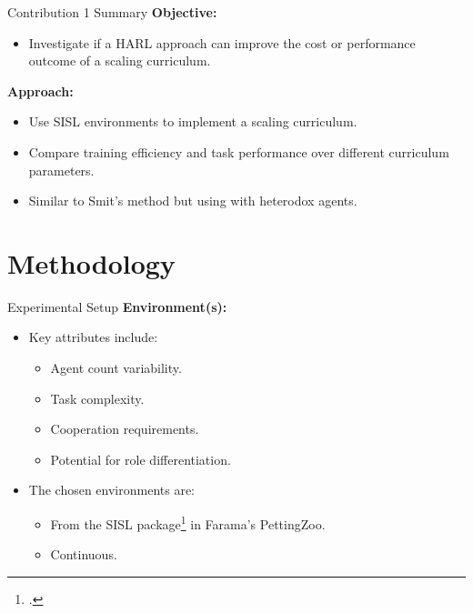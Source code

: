 \documentclass[xcolor={svgnames}]{beamer}
\begin{document}

\begin{frame}{Contribution 1 Summary}
    \textbf{Objective:}
    \begin{itemize}
        \item Investigate if a HARL approach can improve the cost or performance outcome of a
        scaling curriculum.
    \end{itemize}

    \vspace{0.5cm}
    \textbf{Approach:}
    \begin{itemize}
        \item Use SISL environments to implement a scaling curriculum.
        \item Compare training efficiency and task performance over different curriculum parameters.
        \item Similar to Smit's method but using with heterodox agents.
    \end{itemize}

\end{frame}


\section{Methodology}


\begin{frame}{Experimental Setup}
    \textbf{Environment(s):}
    \begin{itemize}
        \item Key attributes include:
        \begin{itemize}
            \item Agent count variability.
            \item Task complexity.
            \item Cooperation requirements.
            \item Potential for role differentiation.
        \end{itemize}
        \item The chosen environments are:
        \begin{itemize}
            \item From the SISL package\footcite{gupta2017} in Farama's PettingZoo.
            \item Continuous.
        \end{itemize}
    \end{itemize}
\end{frame}
\end{document}
